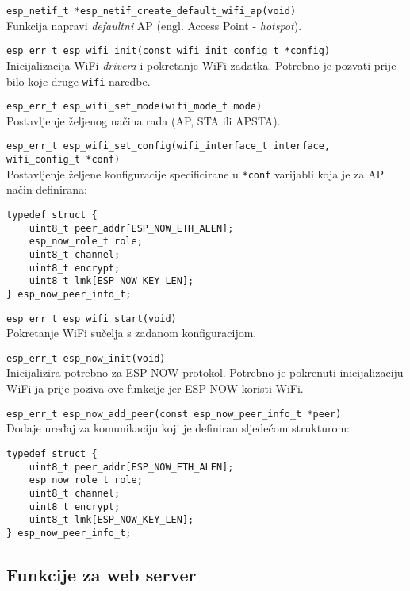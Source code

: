 \documentclass[seminarskirad]{fer}
\begin{document}
\verb|esp_netif_t *esp_netif_create_default_wifi_ap(void)| \\
Funkcija napravi \textit{defaultni} AP (engl. Access Point - \textit{hotspot}).

\verb|esp_err_t esp_wifi_init(const wifi_init_config_t *config)| \\
Inicijalizacija WiFi \textit{drivera} i pokretanje WiFi zadatka. Potrebno je pozvati prije bilo koje druge \verb|wifi| naredbe.

\verb|esp_err_t esp_wifi_set_mode(wifi_mode_t mode)| \\
Postavljenje željenog načina rada (AP, STA ili APSTA).

\verb|esp_err_t esp_wifi_set_config(wifi_interface_t interface, | \\
\verb|wifi_config_t *conf)| \\
Postavljenje željene konfiguracije specificirane u \verb|*conf| varijabli koja je za AP način definirana: 

\begin{verbatim}
typedef struct {
    uint8_t peer_addr[ESP_NOW_ETH_ALEN]; 
    esp_now_role_t role;               
    uint8_t channel;                      
    uint8_t encrypt;                      
    uint8_t lmk[ESP_NOW_KEY_LEN];         
} esp_now_peer_info_t;
\end{verbatim}

\verb|esp_err_t esp_wifi_start(void)| \\
Pokretanje WiFi sučelja s zadanom konfiguracijom.
 
\verb|esp_err_t esp_now_init(void)| \\
Inicijalizira potrebno za ESP-NOW protokol. Potrebno je pokrenuti inicijalizaciju WiFi-ja prije poziva ove funkcije jer ESP-NOW koristi WiFi. 

\verb|esp_err_t esp_now_add_peer(const esp_now_peer_info_t *peer)| \\
Dodaje uređaj za komunikaciju koji je definiran sljedećom strukturom:

\begin{verbatim}
typedef struct {
    uint8_t peer_addr[ESP_NOW_ETH_ALEN]; 
    esp_now_role_t role;               
    uint8_t channel;                      
    uint8_t encrypt;                      
    uint8_t lmk[ESP_NOW_KEY_LEN];         
} esp_now_peer_info_t;
\end{verbatim}

\subsection{Funkcije za web server}
\end{document}
